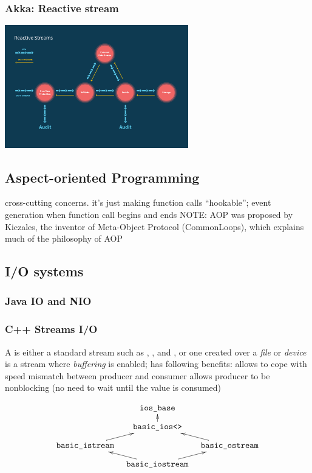 \documentclass{myproc}
\begin{document}
\subsubsection{Akka: Reactive stream}
\centerline{\includegraphics[width=8cm]{pics/akka-reactive-streams}}


\subsection{Aspect-oriented Programming}
\bit
\w cross-cutting concerns.
\w it's just making function calls ``hookable''; event generation when function
call begins and ends
\w NOTE: AOP was proposed by Kiczales, the inventor of Meta-Object Protocol
(CommonLoops), which explains much of the philosophy of AOP
\eit

\subsection{I/O systems}
\subsubsection{Java IO and NIO}
\subsubsection{C++ Streams I/O}
\bit
\w A  is either 
  \ben
  \w a standard stream such as , , and , or
  \w one created over a {\em file\/} or {\em device\/}
  \een
\w {} is a stream where {\em buffering\/} is enabled; 
\w {} has following benefits:
  \ben
  \w allows to cope with speed mismatch between producer and consumer
  \w allows producer to be nonblocking
   (no need to wait until the value is consumed)
  \een

\[ \xymatrix@-1.3pc {
&\mbox{\tt{}ios\_base} &\\
&\mbox{\tt{}basic\_ios<>} \ar[u]&\\
\mbox{\tt{}basic\_istream} \ar[ur] & & 
\mbox{\tt{}basic\_ostream} \ar[ul] \\
&\mbox{\tt{}basic\_iostream} \ar[ur]\ar[ul]&\\
}
\]
\end{document}
